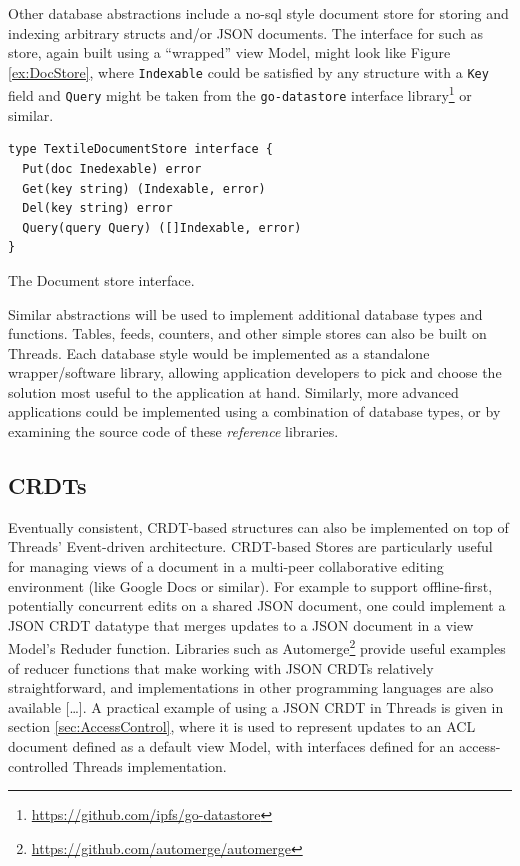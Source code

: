 \documentclass{textile}
\begin{document}
Other database abstractions include a no-sql style document store for storing and indexing arbitrary structs and/or JSON documents. The interface for such as store, again built using a ``wrapped'' view Model, might look like Figure \ref{ex:DocStore}, where \texttt{Indexable} could be satisfied by any structure with a \texttt{Key} field and \texttt{Query} might be taken from the \texttt{go-datastore} interface library\footnote{\url{https://github.com/ipfs/go-datastore}} or similar.

\begin{example}
  \begin{minipage}{.45\textwidth}
    \begin{lstlisting}
type TextileDocumentStore interface {
  Put(doc Inedexable) error
  Get(key string) (Indexable, error)
  Del(key string) error
  Query(query Query) ([]Indexable, error)
}
    \end{lstlisting}
  \end{minipage}
\caption{The Document store interface.}
\label{ex:DocStore}
\end{example} 

Similar abstractions will be used to implement additional database types and functions. Tables, feeds, counters, and other simple stores can also be built on Threads. Each database style would be implemented as a standalone wrapper/software library, allowing application developers to pick and choose the solution most useful to the application at hand. Similarly, more advanced applications could be implemented using a combination of database types, or by examining the source code of these \emph{reference} libraries.

\subsection{CRDTs} \label{sec:TexCRDT}

Eventually consistent, CRDT-based structures can also be implemented on top of Threads' Event-driven architecture. CRDT-based Stores are particularly useful for managing views of a document in a multi-peer collaborative editing environment (like Google Docs or similar). For example to support offline-first, potentially concurrent edits on a shared JSON document, one could implement a JSON CRDT datatype \cite{kleppmannConflictFreeReplicatedJSON2017} that merges updates to a JSON document in a view Model's Reduder function. Libraries such as Automerge\footnote{\url{https://github.com/automerge/automerge}} provide useful examples of reducer functions that make working with JSON CRDTs relatively straightforward, and implementations in other programming languages are also available [\dots]. A practical example of using a JSON CRDT in Threads is given in section \ref{sec:AccessControl}, where it is used to represent updates to an ACL document defined as a default view Model, with interfaces defined for an access-controlled Threads implementation.
\end{document}
